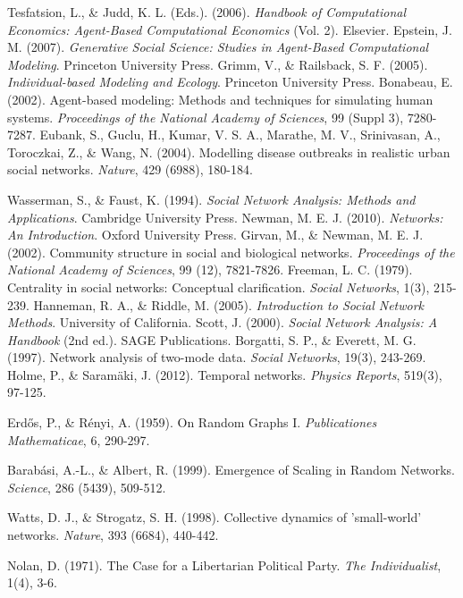 
 Tesfatsion, L., \& Judd, K. L. (Eds.). (2006). \textit{Handbook of Computational Economics: Agent-Based Computational Economics} (Vol. 2). Elsevier.
 Epstein, J. M. (2007). \textit{Generative Social Science: Studies in Agent-Based Computational Modeling}. Princeton University Press.
 Grimm, V., \& Railsback, S. F. (2005). \textit{Individual-based Modeling and Ecology}. Princeton University Press.
 Bonabeau, E. (2002). Agent-based modeling: Methods and techniques for simulating human systems. \textit{Proceedings of the National Academy of Sciences}, 99 (Suppl 3), 7280-7287.
 Eubank, S., Guclu, H., Kumar, V. S. A., Marathe, M. V., Srinivasan, A., Toroczkai, Z., \& Wang, N. (2004). Modelling disease outbreaks in realistic urban social networks. \textit{Nature}, 429 (6988), 180-184.

 Wasserman, S., \& Faust, K. (1994). \textit{Social Network Analysis: Methods and Applications}. Cambridge University Press.
 Newman, M. E. J. (2010). \textit{Networks: An Introduction}. Oxford University Press.
 Girvan, M., \& Newman, M. E. J. (2002). Community structure in social and biological networks. \textit{Proceedings of the National Academy of Sciences}, 99 (12), 7821-7826.
 Freeman, L. C. (1979). Centrality in social networks: Conceptual clarification. \textit{Social Networks}, 1(3), 215-239.
 Hanneman, R. A., \& Riddle, M. (2005). \textit{Introduction to Social Network Methods}. University of California.
 Scott, J. (2000). \textit{Social Network Analysis: A Handbook} (2nd ed.). SAGE Publications.
 Borgatti, S. P., \& Everett, M. G. (1997). Network analysis of two-mode data. \textit{Social Networks}, 19(3), 243-269.
 Holme, P., \& Saramäki, J. (2012). Temporal networks. \textit{Physics Reports}, 519(3), 97-125.

 Erdős, P., \& Rényi, A. (1959). On Random Graphs I. \textit{Publicationes Mathematicae}, 6, 290-297.

 Barabási, A.-L., \& Albert, R. (1999). Emergence of Scaling in Random Networks. \textit{Science}, 286 (5439), 509-512.

 Watts, D. J., \& Strogatz, S. H. (1998). Collective dynamics of 'small-world' networks. \textit{Nature}, 393 (6684), 440-442.

 Nolan, D. (1971). The Case for a Libertarian Political Party. \textit{The Individualist}, 1(4), 3-6.